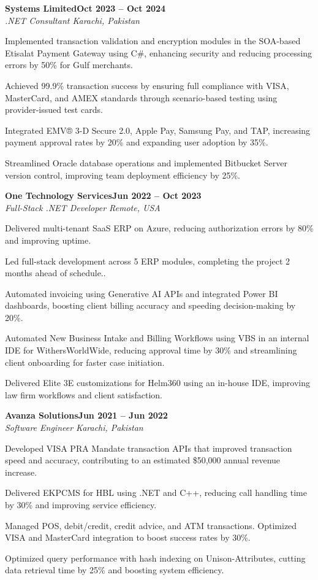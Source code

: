 \documentclass[letterpaper,10pt]{article}
\newcommand{\headingBf}[2]{
  \hspace{10pt}\textbf{#1}\hfill\textbf{#2}\\
}
\newcommand{\headingIt}[2]{
  \hspace{10pt}\textit{#1}\hfill\textit{#2}\\
}
\newenvironment{resume_list}{
  \vspace{-7pt}
  \begin{itemize}[itemsep=-2px, parsep=1pt, leftmargin=30pt]
}{
  \end{itemize}
}
\begin{document}
\headingBf{Systems Limited}{Oct 2023 -- Oct 2024}
\headingIt{.NET Consultant \hfill Karachi, Pakistan}{}
\begin{resume_list}
    \item Implemented transaction validation and encryption modules in the SOA-based Etisalat Payment Gateway using C\#, enhancing security and reducing processing errors by 50\% for Gulf merchants.
    \item Achieved 99.9\% transaction success by ensuring full compliance with VISA, MasterCard, and AMEX standards through scenario-based testing using provider-issued test cards.
    \item Integrated EMV® 3-D Secure 2.0, Apple Pay, Samsung Pay, and TAP, increasing payment approval rates by 20\% and expanding user adoption by 35\%.
    \item Streamlined Oracle database operations and implemented Bitbucket Server version control, improving team deployment efficiency by 25\%.
\end{resume_list}

\headingBf{One Technology Services}{Jun 2022 -- Oct 2023}
\headingIt{Full-Stack .NET Developer \hfill Remote, USA}{}
\begin{resume_list}
    \item Delivered multi-tenant SaaS ERP on Azure, reducing authorization errors by 80\%  and improving uptime.
    \item Led full-stack development across 5 ERP modules, completing the project 2 months ahead of schedule..
    \item Automated invoicing using Generative AI APIs and integrated Power BI dashboards, boosting client billing accuracy and speeding decision-making by 20\%.
    \item Automated New Business Intake and Billing Workflows using VBS in an internal IDE for WithersWorldWide, reducing approval time by 30\% and streamlining client onboarding for faster case initiation.
    \item Delivered Elite 3E customizations for Helm360 using an in-house IDE, improving law firm workflows and client satisfaction.
\end{resume_list}

\headingBf{Avanza Solutions}{Jun 2021 -- Jun 2022}
\headingIt{Software Engineer \hfill Karachi, Pakistan}{}
\begin{resume_list}
    \item Developed VISA PRA Mandate transaction APIs that improved transaction speed and accuracy, contributing to an estimated \$50,000 annual revenue increase.
    \item Delivered EKPCMS for HBL using .NET and C++, reducing call handling time by 30\% and improving service efficiency.
    \item Managed POS, debit/credit, credit advice, and ATM transactions. Optimized VISA and MasterCard integration to boost success rates by 30\%.
    \item Optimized query performance with hash indexing on Unison-Attributes, cutting data retrieval time by 25\% and boosting system efficiency.
\end{resume_list}
\end{document}
